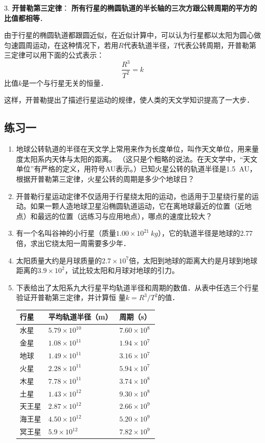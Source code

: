 3. \textbf{ 开普勒第三定律}：\textbf{ 所有行星的椭圆轨道的半长轴的三次方跟公转周期的平方的比值都相等}．


由于行星的椭圆轨道都跟圆近似，在近似计算中，可以认为行星都以太阳为圆心做匀速圆周运动，在这种情况下，若用$R$代表轨道半径，$T$代表公转周期，开普勒第三定律可以用下面的公式表示：
\begin{equation}
	\frac{R^3}{T^2}=k
\end{equation}
比值$k$是一个与行星无关的恒量．

这样，开普勒提出了描述行星运动的规律，使人类的天文学知识提高了一大步．


\subsection*{练习一}
\begin{enumerate}
	\item 地球公转轨道的半径在天文学上常用来作为长度单位，叫作天文单位，用来量度太阳系内天体与太阳的距离。 （这只是个粗略的说法。在天文学中，“天文单位”有严格的定义，用符号AU表示。）已知火星公转的轨道半径是\SI{1.5}{AU}，根据开普勒第三定律，火星公转的周期是多少个地球日？
	\item 开普勒行星运动定律不仅适用于行星绕太阳的运动，也适用于卫星绕行星的运动。如果一颗人造地球卫星沿椭圆轨道运动，它在离地球最近的位置（近地点）和最远的位置（远练习与应用地点），哪点的速度比较大？
	\item 有一个名叫谷神的小行星（质量$1.00\times 10^{21}~\si{kg}$），它的轨道半径是地球的2.77倍，求出它绕太阳一周需要多少年．
	\item 太阳质量大约是月球质量的$2.7\times 10^{7}$倍，太阳到地球的距离大约是月球到地球距离的$3.9\times 10^{2}$，试比较太阳和月球对地球的引力。
	\item 下表给出了太阳系九大行星平均轨道半径和周期的数值．从表中任选三个行星验证开普勒第三定律，并计算恒
	      量$k=R^3/T^2$的值．
	      \begin{table}[H]
		      \centering
		      \begin{tabularx}{0.9\textwidth}{MMM}
			      \toprule[1.5pt]
			      行星  & 平均轨道半径（m）            & 周期（s）             \\
			      \midrule
			      水星  & $5.79\times 10^{10}$ & $7.60\times 10^8$ \\
			      金星  & $1.08\times 10^{11}$ & $1.94\times 10^7$ \\
			      地球  & $1.49\times 10^{11}$ & $3.16\times 10^7$ \\
			      火星  & $2.28\times 10^{11}$ & $5.94\times 10^7$ \\
			      木星  & $7.78\times 10^{11}$ & $3.74\times 10^8$ \\
			      土星  & $1.43\times 10^{12}$ & $9.30\times 10^8$ \\
			      天王星 & $2.87\times 10^{12}$ & $2.66\times 10^9$ \\
			      海王星 & $4.50\times 10^{12}$ & $5.20\times 10^9$ \\
			      冥王星 & $5.9\times 10^{12}$  & $7.82\times 10^9$ \\
			      \bottomrule[1.5pt]
		      \end{tabularx}
	      \end{table}
\end{enumerate}
\newpage
